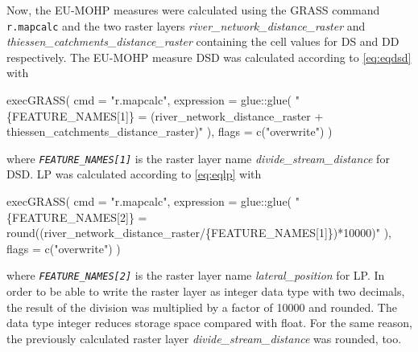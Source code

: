 \documentclass[fleqn,10pt]{wlscirep}
\newenvironment{Shaded}{\begin{snugshade}}{\end{snugshade}}
\newcommand{\AttributeTok}[1]{\textcolor[rgb]{0.77,0.63,0.00}{#1}}
\newcommand{\FunctionTok}[1]{\textcolor[rgb]{0.00,0.00,0.00}{#1}}
\newcommand{\NormalTok}[1]{#1}
\newcommand{\SpecialCharTok}[1]{\textcolor[rgb]{0.00,0.00,0.00}{#1}}
\newcommand{\StringTok}[1]{\textcolor[rgb]{0.31,0.60,0.02}{#1}}
\begin{document}
Now, the EU-MOHP measures were calculated using the GRASS command \texttt{r.mapcalc} and the two raster layers \emph{river\_network\_distance\_raster} and \emph{thiessen\_catchments\_distance\_raster} containing the cell values for DS and DD respectively. The EU-MOHP measure DSD was calculated according to \eqref{eq:eqdsd} with

\footnotesize

\begin{Shaded}
\begin{Highlighting}[]
\FunctionTok{execGRASS}\NormalTok{(}
  \AttributeTok{cmd =} \StringTok{"r.mapcalc"}\NormalTok{,}
  \AttributeTok{expression =}\NormalTok{ glue}\SpecialCharTok{::}\FunctionTok{glue}\NormalTok{(}
    \StringTok{"\{FEATURE\_NAMES[1]\} = (river\_network\_distance\_raster + thiessen\_catchments\_distance\_raster)"}
\NormalTok{  ),}
  \AttributeTok{flags =} \FunctionTok{c}\NormalTok{(}\StringTok{"overwrite"}\NormalTok{)}
\NormalTok{)}
\end{Highlighting}
\end{Shaded}

\normalsize
\noindent
where \emph{\texttt{FEATURE\_NAMES{[}1{]}}} is the raster layer name \emph{divide\_stream\_distance} for DSD.
LP was calculated according to \eqref{eq:eqlp} with

\footnotesize

\begin{Shaded}
\begin{Highlighting}[]
\FunctionTok{execGRASS}\NormalTok{(}
  \AttributeTok{cmd =} \StringTok{"r.mapcalc"}\NormalTok{,}
  \AttributeTok{expression =}\NormalTok{ glue}\SpecialCharTok{::}\FunctionTok{glue}\NormalTok{(}
    \StringTok{"\{FEATURE\_NAMES[2]\} = round((river\_network\_distance\_raster/\{FEATURE\_NAMES[1]\})*10000)"}
\NormalTok{  ),}
  \AttributeTok{flags =} \FunctionTok{c}\NormalTok{(}\StringTok{"overwrite"}\NormalTok{)}
\NormalTok{)}
\end{Highlighting}
\end{Shaded}

\normalsize
\noindent
where \emph{\texttt{FEATURE\_NAMES{[}2{]}}} is the raster layer name \emph{lateral\_position} for LP. In order to be able to write the raster layer as integer data type with two decimals, the result of the division was multiplied by a factor of 10000 and rounded. The data type integer reduces storage space compared with float. For the same reason, the previously calculated raster layer \emph{divide\_stream\_distance} was rounded, too.
\end{document}
